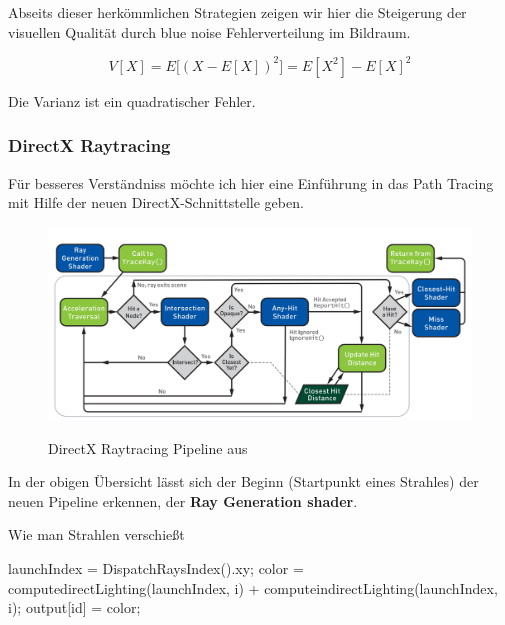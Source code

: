 Abseits dieser herkömmlichen Strategien zeigen wir hier die Steigerung der 
visuellen Qualität durch blue noise Fehlerverteilung im Bildraum.

\begin{equation}\label{eq:Monte-Carlo-Varianz}
    V[X] = E\biggl[(X-E[X])^{2}\biggl] = E[X^{2}]
    - E[X]^{2}
\end{equation}

Die Varianz  ist ein quadratischer Fehler.

\subsubsection{DirectX Raytracing}
Für besseres Verständniss möchte ich hier eine Einführung in das Path Tracing\cite{Benty18} mit Hilfe der
neuen DirectX-Schnittstelle geben.

\begin{figure}[H]
    \centering
    \includegraphics[width=\linewidth]{content/PathTracer/Bilder/DirectXRaytracingPipeline.png}
    \label{pic::DirectXRaytracing-Pipeline}
    \caption{DirectX Raytracing Pipeline aus \cite{Haines2019}}
\end{figure}

In der obigen Übersicht lässt sich der Beginn (Startpunkt eines Strahles) der neuen Pipeline erkennen,
der \textbf{Ray Generation shader}.

\begin{algorithm}[H]
    \caption{Wie man Strahlen verschießt}
    \begin{algorithmic}[1]
        \State launchIndex = DispatchRaysIndex().xy;
            \State color = computedirectLighting(launchIndex, i) + computeindirectLighting(launchIndex, i);
        \EndFor
        \State output[id] = color;
    \end{algorithmic}
    \label{alg:Ray Gen}
\end{algorithm}

